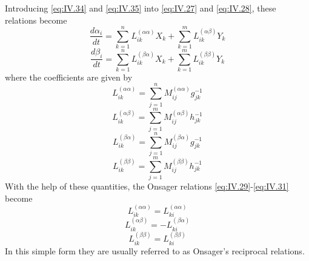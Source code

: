 Introducing \eqref{eq:IV.34} and \eqref{eq:IV.35} into \eqref{eq:IV.27} and \eqref{eq:IV.28}, these relations become
\begin{equation}
\frac{d \alpha_i}{d t}
=
\sum_{k=1}^n
L_{ik}^{(\alpha \alpha)}
X_k
+
\sum_{k=1}^m
L_{ik}^{(\alpha \beta)}
Y_k
    \label{eq:IV.36}
\end{equation}
\begin{equation}
\frac{d \beta_i}{d t}
=
\sum_{k=1}^n
L_{ik}^{(\beta \alpha)}
X_k
+
\sum_{k=1}^m
L_{ik}^{(\beta \beta)}
Y_k
    \label{eq:IV.37}
\end{equation}
where the coefficients are given by
\begin{equation}
L_{ik}^{(\alpha \alpha)}
=
\sum_{j=1}^n
M_{ij}^{(\alpha \alpha)}
g_{jk}^{-1}
    \label{eq:IV.38}
\end{equation}
\begin{equation}
L_{ik}^{(\alpha \beta)}
=
\sum_{j=1}^m
M_{ij}^{(\alpha \beta)}
h_{jk}^{-1}
    \label{eq:IV.39}
\end{equation}
\begin{equation}
L_{ik}^{(\beta \alpha)}
=
\sum_{j=1}^n
M_{ij}^{(\beta \alpha)}
g_{jk}^{-1}
    \label{eq:IV.40}
\end{equation}
\begin{equation}
L_{ik}^{(\beta \beta)} 
=
\sum_{j=1}^m
M_{ij}^{(\beta \beta)} 
h_{jk}^{-1}
    \label{eq:IV.41}
\end{equation}
With the help of these quantities, the Onsager relations \eqref{eq:IV.29}-\eqref{eq:IV.31} become
\begin{equation}
L_{ik}^{(\alpha \alpha)} = L_{ki}^{(\alpha \alpha)}
    \label{eq:IV.42}
\end{equation}
\begin{equation}
L_{ik}^{(\alpha \beta)} = -L_{ki}^{(\beta \alpha)}
    \label{eq:IV.43}
\end{equation}
\begin{equation}
L_{ik}^{(\beta \beta)} = L_{ki}^{(\beta \beta)}
    \label{eq:IV.44}
\end{equation}
In this simple form they are usually referred to as Onsager's reciprocal relations.


